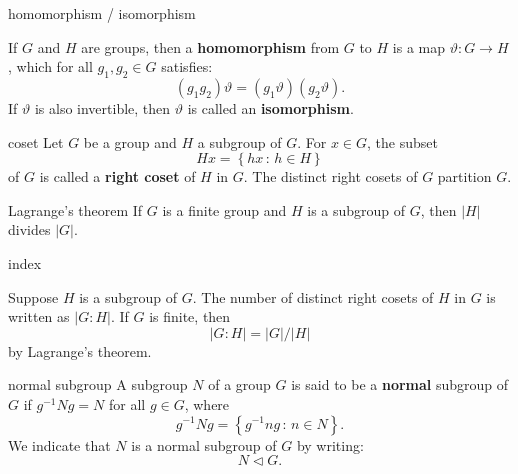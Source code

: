 \documentclass[avery5371,grid]{flashcards}
\newcommand{\abs}[1]{\ensuremath{\left| #1 \right|}}
\newcommand{\set}[2]{\ensuremath{\left\{ #1 \, : \, #2 \right\}}}
\newcommand{\normal}{\ensuremath{\lhd}}
\newcommand{\defn}[1]{\textbf{#1}}
\begin{document}
\begin{flashcard}[Definition]{homomorphism / isomorphism}

  If $G$ and $H$ are groups, then a \defn{homomorphism} from $G$ to
  $H$ is a map $\vartheta : G \to H$, which for all $g_1, g_2 \in G$
  satisfies:
  \[
    (g_1 g_2) \vartheta = (g_1 \vartheta)(g_2 \vartheta).
  \]
  If $\vartheta$ is also invertible, then $\vartheta$ is called an
  \defn{isomorphism}. 
\end{flashcard}

\begin{flashcard}[Definition]{coset}
  Let $G$ be a group and $H$ a subgroup of $G$. For $x \in G$, the subset
  \[
    Hx = \set{hx}{h \in H}
  \]
  of $G$ is called a \defn{right coset} of $H$ in $G$. The distinct
  right cosets of $G$ partition $G$.
\end{flashcard}


\begin{flashcard}[Theorem]{Lagrange's theorem}
  If $G$ is a finite group and $H$ is a subgroup of $G$, then
  $\abs{H}$ divides $\abs{G}$.
\end{flashcard}

\begin{flashcard}[Definition]{index}

  Suppose $H$ is a subgroup of $G$. The number of distinct right
  cosets of $H$ in $G$ is written as $\abs{G : H}$. If $G$ is finite,
  then
  \[
    \abs{G : H} =\abs{G}/\abs{H}
  \]
  by Lagrange's theorem.

\end{flashcard}

\begin{flashcard}[Definition]{normal subgroup}
  A subgroup $N$ of a group $G$ is said to be a \defn{normal} subgroup
  of $G$ if $g^{-1}Ng = N$ for all $g \in G$, where
  \[
    g^{-1}Ng = \set{g^{-1}ng}{n \in N}.
  \]
  We indicate that $N$ is a normal subgroup of $G$ by writing:
  \[
    N \normal G.
  \]
\end{flashcard}
\end{document}
